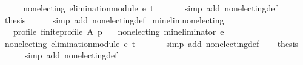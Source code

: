 \begin{isabellebody}
\isatagproof
{}\isamarkupfalse%
\ {\isacharminus}{\kern0pt}\isanewline
\ \ \isamarkupfalse%
\ {\isachardoublequoteopen}non{\isacharunderscore}{\kern0pt}electing\ {\isacharparenleft}{\kern0pt}elimination{\isacharunderscore}{\kern0pt}module\ e\ t\ {\isacharparenleft}{\kern0pt}{\isacharless}{\kern0pt}{\isacharparenright}{\kern0pt}{\isacharparenright}{\kern0pt}{\isachardoublequoteclose}\isanewline
\ \ \ \ \isamarkupfalse%
\ {\isacharparenleft}{\kern0pt}simp\ add{\isacharcolon}{\kern0pt}\ non{\isacharunderscore}{\kern0pt}electing{\isacharunderscore}{\kern0pt}def{\isacharparenright}{\kern0pt}\isanewline
\ \ \isamarkupfalse%
\ {\isacharquery}{\kern0pt}thesis\isanewline
\ \ \ \ \isamarkupfalse%
\ {\isacharparenleft}{\kern0pt}simp\ add{\isacharcolon}{\kern0pt}\ non{\isacharunderscore}{\kern0pt}electing{\isacharunderscore}{\kern0pt}def{\isacharparenright}{\kern0pt}\isanewline
{}\isamarkupfalse%
%
\endisatagproof
{\isafoldproof}%
%
\isadelimproof
\isanewline
%
\endisadelimproof
\isanewline
{}\isamarkupfalse%
\ min{\isacharunderscore}{\kern0pt}elim{\isacharunderscore}{\kern0pt}non{\isacharunderscore}{\kern0pt}electing{\isacharcolon}{\kern0pt}\isanewline
\ \ \ profile{\isacharcolon}{\kern0pt}\ {\isachardoublequoteopen}finite{\isacharunderscore}{\kern0pt}profile\ A\ p{\isachardoublequoteclose}\isanewline
\ \ \ {\isachardoublequoteopen}non{\isacharunderscore}{\kern0pt}electing\ {\isacharparenleft}{\kern0pt}min{\isacharunderscore}{\kern0pt}eliminator\ e{\isacharparenright}{\kern0pt}{\isachardoublequoteclose}\isanewline
%
\isadelimproof
%
\endisadelimproof
%
\isatagproof
{}\isamarkupfalse%
\ {\isacharminus}{\kern0pt}\isanewline
\ \ \isamarkupfalse%
\ {\isachardoublequoteopen}non{\isacharunderscore}{\kern0pt}electing\ {\isacharparenleft}{\kern0pt}elimination{\isacharunderscore}{\kern0pt}module\ e\ t\ {\isacharparenleft}{\kern0pt}{\isacharless}{\kern0pt}{\isacharparenright}{\kern0pt}{\isacharparenright}{\kern0pt}{\isachardoublequoteclose}\isanewline
\ \ \ \ \isamarkupfalse%
\ {\isacharparenleft}{\kern0pt}simp\ add{\isacharcolon}{\kern0pt}\ non{\isacharunderscore}{\kern0pt}electing{\isacharunderscore}{\kern0pt}def{\isacharparenright}{\kern0pt}\isanewline
\ \ \isamarkupfalse%
\ {\isacharquery}{\kern0pt}thesis\isanewline
\ \ \ \ \isamarkupfalse%
\ {\isacharparenleft}{\kern0pt}simp\ add{\isacharcolon}{\kern0pt}\ non{\isacharunderscore}{\kern0pt}electing{\isacharunderscore}{\kern0pt}def{\isacharparenright}{\kern0pt}\isanewline

\end{isabellebody}
